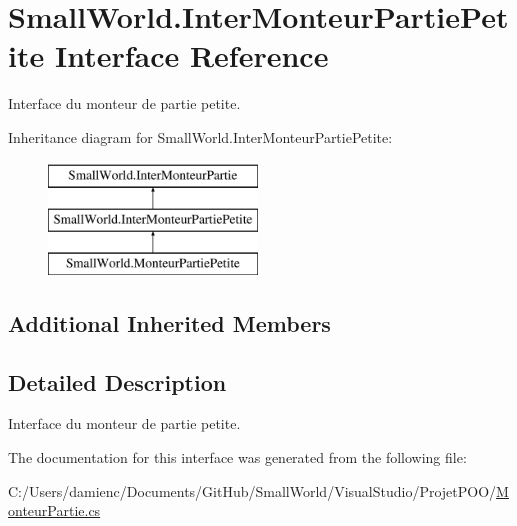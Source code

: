 \hypertarget{interface_small_world_1_1_inter_monteur_partie_petite}{\section{Small\-World.\-Inter\-Monteur\-Partie\-Petite Interface Reference}
\label{interface_small_world_1_1_inter_monteur_partie_petite}
}


Interface du monteur de partie petite.  


Inheritance diagram for Small\-World.\-Inter\-Monteur\-Partie\-Petite\-:\begin{figure}[H]
\begin{center}
\leavevmode
\includegraphics[height=3.000000cm]{interface_small_world_1_1_inter_monteur_partie_petite}
\end{center}
\end{figure}
\subsection*{Additional Inherited Members}


\subsection{Detailed Description}
Interface du monteur de partie petite. 

The documentation for this interface was generated from the following file\-:\begin{DoxyCompactItemize}
\item 
C\-:/\-Users/damienc/\-Documents/\-Git\-Hub/\-Small\-World/\-Visual\-Studio/\-Projet\-P\-O\-O/\hyperlink{_monteur_partie_8cs}{Monteur\-Partie.\-cs}\end{DoxyCompactItemize}
